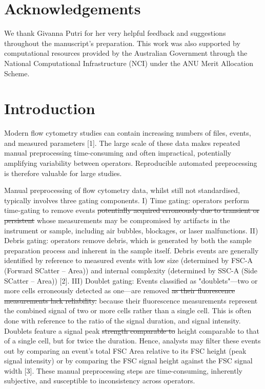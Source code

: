 \documentclass[ASNA]{latex/wiley/USG}
\begin{document}
\section*{Acknowledgements}
We thank Givanna Putri for her very helpful feedback and suggestions
throughout the manuscript's preparation. This work was also supported by
computational resources provided by the Australian Government through
the National Computational Infrastructure (NCI) under the ANU Merit
Allocation Scheme.

\FloatBarrier

\section{Introduction}\label{introduction}

Modern flow cytometry studies can contain increasing numbers of files,
events, and measured parameters {[}1{]}. The large scale of these data
makes repeated manual preprocessing time-consuming and often
impractical, potentially amplifying variability between operators.
Reproducible automated preprocessing is therefore valuable for large
studies.

Manual preprocessing of flow cytometry data, whilst still not
standardised, typically involves three gating components. I) Time
gating: operators perform time-gating to remove events
{\color{revisionred}\sout{potentially acquired erroneously due to
transient or persistent}} {\color{revisionblue}whose measurements may be
compromised by} artifacts in the instrument or sample, including air
bubbles, blockages, or laser malfunctions. II) Debris gating: operators
remove debris, which is generated by both the sample preparation process
and inherent in the sample itself. Debris events are generally
identified by reference to measured events with low size (determined by
FSC-A (Forward SCatter -- Area)) and internal complexity (determined by
SSC-A (Side SCatter -- Area)) {[}2{]}. III) Doublet gating: Events
classified as "doublets"---two or more cells erroneously detected as
one---are removed {\color{revisionred}\sout{as their fluorescence
measurements lack reliability.}} {\color{revisionblue}because their
fluorescence measurements represent the combined signal of two or more
cells rather than a single cell.} This is often done with reference to
the ratio of the signal duration, and signal intensity. Doublets feature
a signal peak {\color{revisionred}\sout{strength comparable to}}
{\color{revisionblue}height comparable to that of} a single cell, but
for twice the duration. Hence, analysts may filter these events out by
comparing an event's total FSC Area relative to its FSC height (peak
signal intensity) or by comparing the FSC signal height against the FSC
signal width {[}3{]}. These manual preprocessing steps are
time-consuming, inherently subjective, and susceptible to inconsistency
across operators.
\end{document}
